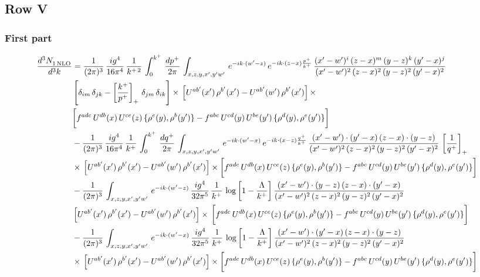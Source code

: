 \documentclass[9pt]{article}
\numberwithin{equation}{section}
\begin{document}
\subsection{Row V}
\subsubsection*{First part}
\begin{align}
     \frac{d^{3}N_{1\,\rm NLO}^{\rm}}{d^{3}k}  & = \frac{1}{(2\pi)^{3}}\, \frac{ig^{4}}{16\pi^{4}}\, \frac{1}{k^{+\,2}}\,\int_{0}^{k^{+}}\, \frac{dp^{+}}{2\pi}\,\int_{x,z,y,x',y'w'}\,e^{-ik\cdot (w^\prime-z)}\,e^{-ik\cdot (z-x)\frac{p^{+}}{k^{+}}}\,\frac{(x'-w')^{i}\,(z-x)^{m}\,(y-z)^{k}\,(y'-x)^{j}}{(x'-w')^{2}\,(z-x)^{2}\,(y-z)^{2}\,(y'-x)^{2}}\,\notag \\ & \left[\delta_{im}\,\delta_{jk}-\left[\frac{k^{+}}{p^{+}}\right]_{+}\, \delta_{jm}\,\delta_{ik}\right]\times\, \left[U^{ab'}(x')\,\rho^{b'}(x')-U^{ab'}(w')\,\rho^{b'}(x')\right]\times\notag \\ & \bigg[f^{adc}\,U^{db}(x)\,U^{ce}(z)\, \{\rho^{e}(y),\rho^{b}(y')\}-f^{abc}\,U^{cd}(y)\,U^{be}(y')\, \{\rho^{d}(y),\rho^{e}(y')\}\bigg]\notag \\ & -\frac{1}{(2\pi)^{3}}\, \frac{ig^{4}}{16\pi^{4}}\, \frac{1}{k^{+}}\,\int_{0}^{k^{+}}\, \frac{dq^{+}}{2\pi}\,\int_{x,z,y,x',y'w'}\,e^{-ik\cdot (w^\prime-x)}\,e^{-ik\cdot (x-z)\frac{q^{+}}{k^{+}}}\,\frac{(x'-w')\cdot (y'-x)\,(z-x)\cdot (y-z)}{(x'-w')^{2}\,(z-x)^{2}\,(y-z)^{2}\,(y'-x)^{2}}\,\left[\frac{1}{q^{+}}\right]_{+}\notag \\ & \times\, \left[U^{ab'}(x')\,\rho^{b'}(x')-U^{ab'}(w')\,\rho^{b'}(x')\right]\times \bigg[f^{adc}\,U^{db}(x)\,U^{ce}(z)\, \{\rho^{e}(y),\rho^{b}(y')\}-f^{abc}\,U^{cd}(y)\,U^{be}(y')\, \{\rho^{d}(y),\rho^{e}(y')\}\bigg]\notag \\ & -\frac{1}{(2\pi)^{3}}\, \int_{x,z,y,x',y'w'}\,e^{-ik\cdot (w^\prime-z)}\,\frac{ig^{4}}{32\pi^{5}}\, \frac{1}{k^{+}}\,\log{\left[1-\frac{\Lambda}{k^{+}}\right]}\,\frac{(x'-w')\cdot (y-z)\,(z-x)\cdot (y'-x)}{(x'-w')^{2}\,(z-x)^{2}\,(y-z)^{2}\,(y'-x)^{2}}\,\notag \\ & \left[U^{ab'}(x')\,\rho^{b'}(x')-U^{ab'}(w')\,\rho^{b'}(x')\right]\times\, \bigg[f^{adc}\,U^{db}(x)\,U^{ce}(z)\, \{\rho^{e}(y),\rho^{b}(y')\}-f^{abc}\,U^{cd}(y)\,U^{be}(y')\, \{\rho^{d}(y),\rho^{e}(y')\}\bigg]\notag \\ &  -\frac{1}{(2\pi)^{3}}\, \int_{x,z,y,x',y'w'}\,e^{-ik\cdot (w^\prime-x)}\,\frac{ig^{4}}{32\pi^{5}}\, \frac{1}{k^{+}}\, \log{\left[1-\frac{\Lambda}{k^{+}}\right]}\,\frac{(x'-w')\cdot (y'-x)\,(z-x)\cdot (y-z)}{(x'-w')^{2}\,(z-x)^{2}\,(y-z)^{2}\,(y'-x)^{2}}\notag \\ & \times\, \left[U^{ab'}(x')\,\rho^{b'}(x')-U^{ab'}(w')\,\rho^{b'}(x')\right]\times \bigg[f^{adc}\,U^{db}(x)\,U^{ce}(z)\, \{\rho^{e}(y),\rho^{b}(y')\}-f^{abc}\,U^{cd}(y)\,U^{be}(y')\, \{\rho^{d}(y),\rho^{e}(y')\}\bigg]
\end{align}
\end{document}
